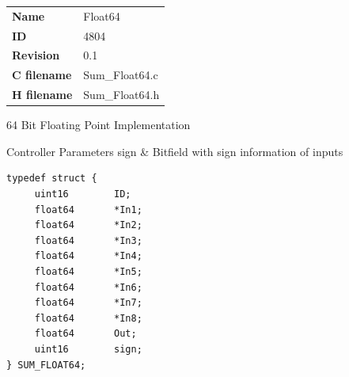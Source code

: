\ifdefined \AddTestReports
{}
\fi
{}
\nopagebreak[0]
\begin{tabular}{l l}
\textbf{Name} & Float64 \tabularnewline
\textbf{ID} & 4804 \tabularnewline
\textbf{Revision} & 0.1 \tabularnewline
\textbf{C filename} & Sum\_Float64.c \tabularnewline
\textbf{H filename} & Sum\_Float64.h \tabularnewline
\end{tabular}
\vspace{1ex}

64 Bit Floating Point Implementation

\begin{XtoCtabular}{Controller Parameters}
sign & Bitfield with sign information of inputs\tabularnewline
\hline
\end{XtoCtabular}

\begin{lstlisting}
typedef struct {
     uint16        ID;
     float64       *In1;
     float64       *In2;
     float64       *In3;
     float64       *In4;
     float64       *In5;
     float64       *In6;
     float64       *In7;
     float64       *In8;
     float64       Out;
     uint16        sign;
} SUM_FLOAT64;
\end{lstlisting}

\ifdefined \AddTestReports
{}
\fi
